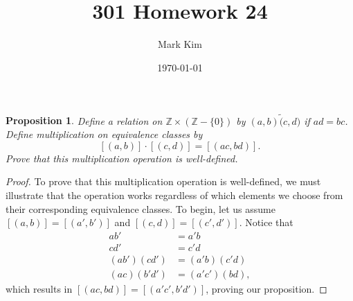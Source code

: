 \documentclass[12pt]{amsart}
\title{301 Homework 24}
\author{Mark Kim}
\date{\today}
\newcommand{\Z}{\mathbb{Z}}
\newtheorem*{proposition}{Proposition}
\begin{document}
\maketitle

\begin{proposition}
Define a relation on $\Z \times (\Z - \{0\})$ by $(a,b) \tilde (c,d)$ if $ad = bc$. Define multiplication on equivalence classes by
\[
[(a,b)]\cdot[(c,d)] = [(ac,bd)].
\]
Prove that this multiplication operation is well-defined.
\end{proposition}

\begin{proof}
To prove that this multiplication operation is well-defined, we must illustrate that the operation works regardless of which elements we choose from their corresponding equivalence classes.  To begin, let us assume $[(a,b)] = [(a',b')]$ and $[(c,d)] = [(c',d')]$.  Notice that
\begin{align*}
ab' &= a'b\\
cd' &= c'd\\
(ab')(cd') &= (a'b)(c'd)\\
(ac)(b'd') &= (a'c')(bd),
\end{align*}
which results in $[(ac,bd)] = [(a'c', b'd')]$, proving our proposition.
\end{proof}
\end{document}
